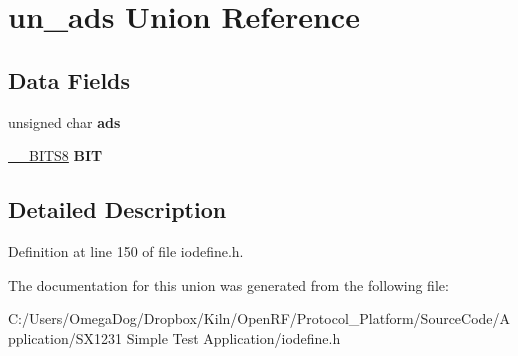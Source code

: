 \hypertarget{unionun__ads}{\section{un\-\_\-ads Union Reference}
\label{unionun__ads}
}
\subsection*{Data Fields}
\begin{DoxyCompactItemize}
\item 
\hypertarget{unionun__ads_a0618eaddb7214dac5f0d100e67b045f0}{unsigned char {\bfseries ads}}\label{unionun__ads_a0618eaddb7214dac5f0d100e67b045f0}

\item 
\hypertarget{unionun__ads_aa0f0f5e67fda7a61060db1ad35e26bcc}{\hyperlink{struct_____b_i_t_s8}{\-\_\-\-\_\-\-B\-I\-T\-S8} {\bfseries B\-I\-T}}\label{unionun__ads_aa0f0f5e67fda7a61060db1ad35e26bcc}

\end{DoxyCompactItemize}


\subsection{Detailed Description}


Definition at line 150 of file iodefine.\-h.



The documentation for this union was generated from the following file\-:\begin{DoxyCompactItemize}
\item 
C\-:/\-Users/\-Omega\-Dog/\-Dropbox/\-Kiln/\-Open\-R\-F/\-Protocol\-\_\-\-Platform/\-Source\-Code/\-Application/\-S\-X1231 Simple Test Application/iodefine.\-h\end{DoxyCompactItemize}
